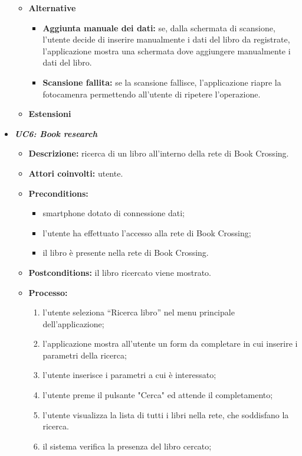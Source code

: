 \begin{itemize}
\begin{itemize}
\begin{enumerate}
		\end{enumerate}
		\item \textbf{Alternative}
		\begin{itemize}
			\item \textbf{Aggiunta manuale dei dati:} se, dalla schermata di scansione, l'utente decide di inserire manualmente i dati del libro da registrate, l'applicazione mostra una schermata dove aggiungere manualmente i dati del libro.
			\item \textbf{Scansione fallita:} se la scansione fallisce, l'applicazione riapre la fotocamenra permettendo all'utente di ripetere l'operazione.
		\end{itemize}
		\item \textbf{Estensioni}
	\end{itemize}
	\item \textbf{\textit{UC6: Book research}} \label{itemize:UC6}
	\begin{itemize}
		\item \textbf{Descrizione:} ricerca di un libro all’interno della rete di Book Crossing.
		\item \textbf{Attori coinvolti:} utente.
		\item \textbf{Preconditions:}
		\begin{itemize}
			\item smartphone dotato di connessione dati;
			\item l’utente ha effettuato l’accesso alla rete di Book Crossing;
			\item il libro è presente nella rete di Book Crossing.
		\end{itemize}
		\item \textbf{Postconditions:} il libro ricercato viene mostrato.
		\item \textbf{Processo:}
		\begin{enumerate}
			\item l’utente seleziona “Ricerca libro” nel menu principale dell’applicazione;
			\item l’applicazione mostra all'utente un form da completare in cui inserire i parametri della ricerca;
			\item l’utente inserisce i parametri a cui è interessato;
			\item l'utente preme il pulsante "Cerca" ed attende il completamento;
			\item l'utente visualizza la lista di tutti i libri nella rete, che soddisfano la ricerca.
			\item il sistema verifica la presenza del libro cercato;

\end{enumerate}
\end{itemize}
\end{itemize}
